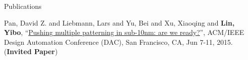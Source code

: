 \begin{rSection}{Publications}
\begin{description}[font=\normalfont]
{}
        

\item[{[C1]}]{
        Pan, David Z. and Liebmann, Lars and Yu, Bei and Xu, Xiaoqing and \textbf{Lin, Yibo}, 
    ``\href{http://dl.acm.org/citation.cfm?id=2744769.2747940}{Pushing multiple patterning in sub-10nm: are we ready?}'', 
    ACM/IEEE Design Automation Conference (DAC), San Francisco, CA, Jun 7-11, 2015.
    (\textbf{Invited Paper})
}
        

\end{description}
    

\end{rSection}


